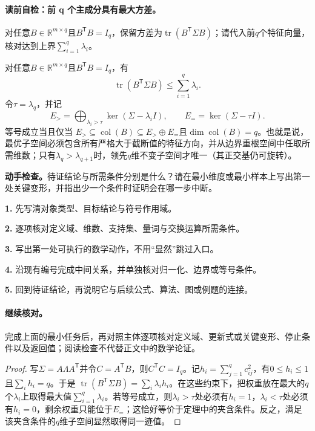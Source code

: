 \paragraph{读前自检：前 q 个主成分具有最大方差。}对任意$B\in\mathbb R^{m\times q}$且$B^{\mathsf T}B=I_q$，保留方差为$\operatorname{tr}(B^{\mathsf T}\Sigma B)$；请代入前$q$个特征向量，核对达到上界$\sum_{i=1}^q\lambda_i$。\par

\begin{theorem}[前$q$维最大保留方差]\label{thm:V4-C04-max-variance}
对任意$B\in\mathbb R^{m\times q}$且$B^{\mathsf T}B=I_q$，有
\[
\operatorname{tr}(B^{\mathsf T}\Sigma B)\le\sum_{i=1}^q\lambda_i.
\]
令$\tau=\lambda_q$，并记
\[
E_{>}=\bigoplus_{\lambda_i>\tau}\ker(\Sigma-\lambda_iI),
\qquad E_{=}=\ker(\Sigma-\tau I).
\]
等号成立当且仅当
$E_{>}\subseteq\operatorname{col}(B)\subseteq E_{>}\oplus E_{=}$且$\dim\operatorname{col}(B)=q$。也就是说，最优子空间必须包含所有严格大于截断值的特征方向，并从边界重根空间中任取所需维数；只有$\lambda_q>\lambda_{q+1}$时，领先$q$维不变子空间才唯一（其正交基仍可旋转）。
\end{theorem}
\begin{keypointbox}[title={证明：前 q 维最大保留方差：证明阅读检查}]
\textbf{动手检查。}待证结论与所需条件分别是什么？请在最小维度或最小样本上写出第一处关键变形，并指出少一个条件时证明会在哪一步中断。\par
\textbf{1.} 先写清对象类型、目标结论与符号作用域。\par
\textbf{2.} 逐项核对定义域、维数、支持集、量词与交换运算所需条件。\par
\textbf{3.} 写出第一处可执行的数学动作，不用“显然”跳过入口。\par
\textbf{4.} 沿现有编号完成中间关系，并单独核对归一化、边界或等号条件。\par
\textbf{5.} 回到待证结论，再说明它与后续公式、算法、图或例题的连接。
\end{keypointbox}
\paragraph{继续核对。}完成上面的最小任务后，再对照主体逐项核对定义域、更新式或关键变形、停止条件以及返回值；阅读检查不代替正文中的数学论证。

\begin{proof}
写$\Sigma=A\Lambda A^{\mathsf T}$并令$C=A^{\mathsf T}B$，则$C^{\mathsf T}C=I_q$。记$h_i=\sum_{j=1}^q c_{ij}^2$，有$0\le h_i\le1$且$\sum_i h_i=q$。于是
$\operatorname{tr}(B^{\mathsf T}\Sigma B)=\sum_i\lambda_i h_i$。在这些约束下，把权重放在最大的$q$个$\lambda_i$上取得最大值$\sum_{i=1}^q\lambda_i$。若等号成立，则$\lambda_i>\tau$处必须有$h_i=1$，$\lambda_i<\tau$处必须有$h_i=0$，剩余权重只能位于$E_=$；这恰好等价于定理中的夹含条件。反之，满足该夹含条件的$q$维子空间显然取得同一迹值。
\end{proof}

